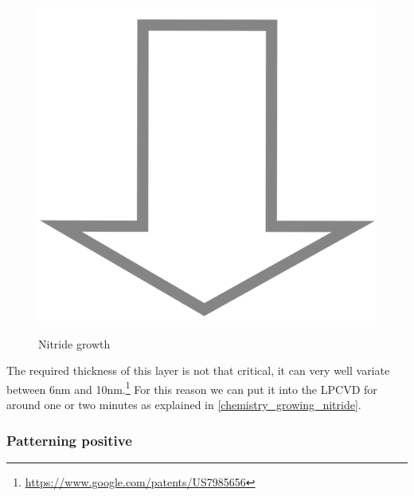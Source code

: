\begin{figure}[H]
	\centering
	\begin{tikzpicture}[node distance = 3cm, auto, thick,scale=\CrossSectionOnly, every node/.style={transform shape}]
		
	\end{tikzpicture} \\
	\includegraphics[scale=0.01]{down_arrow.png} \\
	\begin{tikzpicture}[node distance = 3cm, auto, thick,scale=\CrossSectionOnly, every node/.style={transform shape}]
		
	\end{tikzpicture}
	\caption{Nitride growth}
\end{figure}

The required thickness of this layer is not that critical, it can very well variate between 6nm and 10nm.\footnote{\url{https://www.google.com/patents/US7985656}}
For this reason we can put it into the LPCVD for around one or two minutes as explained in \autoref{chemistry_growing_nitride}.

\subsubsection{Patterning positive}

